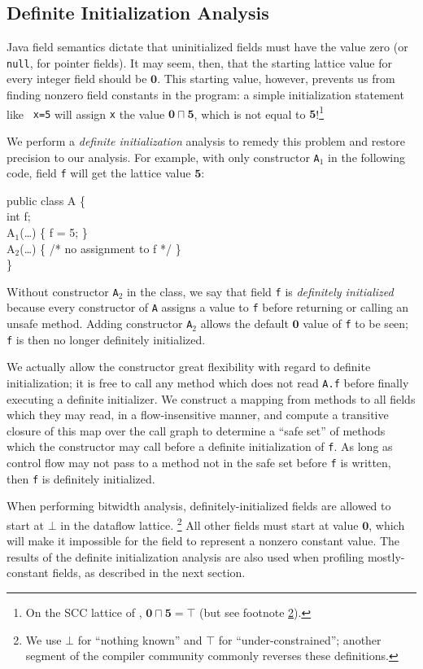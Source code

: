 \documentclass{sig-alt-full}
\newcommand{\meet}{\ensuremath{\sqcap}}
\begin{document}
\subsection{Definite Initialization Analysis}
Java field semantics dictate that uninitialized fields must have
the value zero (or {\tt null}, for pointer fields).  It may seem,
then, that the starting lattice value for every integer field should
be $\mathbf{0}$.  This starting value, however, prevents us from
finding nonzero field
constants in the program: a simple initialization statement like {\tt
  x=5} will assign {\tt x} the value $\mathbf{0}\meet\mathbf{5}$,
which is not equal to $\mathbf{5}$!\footnote{On the SCC lattice of
\cite{wegman91:scc}, $\mathbf{0}\meet\mathbf{5}=\top$ (but see
footnote \ref{ft:topbot}).}

We perform a {\it definite initialization} analysis to remedy this
problem and restore precision to our analysis.
For example, with only constructor {\tt A$_1$} in the following code,
field {\tt f} will get the lattice value $\mathbf{5}$:
{\small\renewcommand{\baselinestretch}{0.5}\begin{samplecode}
public class A \{\\
\>int f;\\
\>A$_1$(\ldots) \{ f = 5; \}\\
\>A$_2$(\ldots) \{ /* no assignment to f */ \}\\
\}
\end{samplecode}%
}
Without constructor {\tt A$_2$} in the class,
we say that field {\tt f} is {\it definitely initialized} because
every constructor of {\tt A} assigns a value to {\tt f} before
returning or calling an unsafe method.
Adding constructor {\tt A$_2$} allows the
default $\mathbf{0}$ value of {\tt f} to be seen; {\tt f} is then no longer
definitely initialized.

We actually allow the constructor great flexibility with regard to
definite initialization; it is free to call any method which does not
read {\tt A.f} before finally executing a definite initializer.
We construct a mapping from methods to all
fields which they may read, in a flow-insensitive manner, and compute
a transitive closure of this map over the call graph to determine 
a ``safe set'' of
methods which the constructor may call before a definite
initialization of {\tt f}.  As long as control flow may not pass to a
method not in the safe set before {\tt f} is written, then {\tt f} is
definitely initialized.

When performing bitwidth analysis,
definitely-initialized fields are allowed to start at $\bot$ in the
dataflow lattice.%
\footnote{We use $\bot$ for ``nothing known'' and $\top$ for
  ``under-constrained''; another segment of the compiler community
  commonly reverses these definitions.\label{ft:topbot}}
  All other fields must start at value
$\mathbf{0}$, which will make it impossible for the field to represent a
nonzero constant value.  The results of the definite initialization
analysis are also used when profiling mostly-constant fields, as described
in the next section.
%
\end{document}

